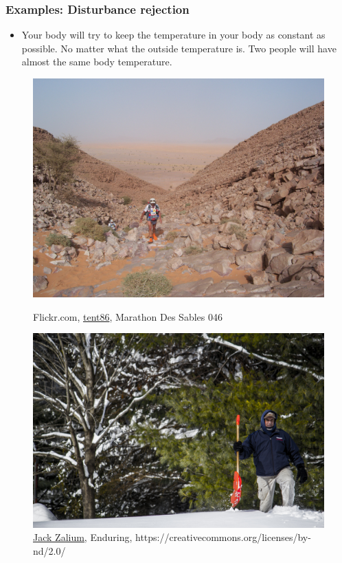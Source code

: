 \begin{frame}
	\frametitle{Examples: Disturbance rejection}
	\begin{itemize}
		\item Your body will try to keep the temperature in your body as constant as possible. No matter what the outside temperature is. Two people will have almost the same body temperature.
	\end{itemize}
	\begin{figure}
\centering
\begin{minipage}{0.45\textwidth}
\includegraphics[width=0.7\linewidth]{marathon-des-sables}
\caption{Flickr.com, \underline{tent86}, Marathon Des Sables 046}
\label{fig:marathon-des-sables}
\end{minipage}
\centering
\begin{minipage}{0.45\textwidth}
\includegraphics[width=0.7\linewidth]{enduring}
\caption{\underline{Jack Zalium,} Enduring, https://creativecommons.org/licenses/by-nd/2.0/}
\label{fig:enduring}
\end{minipage}
\end{figure}

\end{frame}


